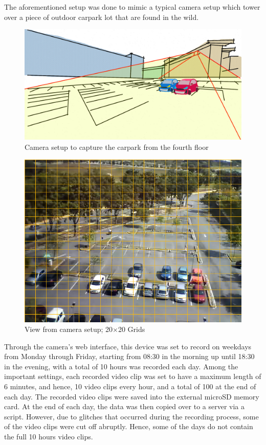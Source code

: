 The aforementioned setup was done to mimic a typical camera setup which tower over a piece of outdoor carpark lot that are found in the wild. 


\begin{figure}[hbt!]\centering
\includegraphics[width=.8\textwidth]{image/fcicarpark2.png}
\caption{Camera setup to capture the carpark from the fourth floor}
\label{fig:camerasetup}
\end{figure}


\begin{figure}[hbt!]\centering
\includegraphics[width=.7\textwidth]{image/general/grids.png}
\caption{View from camera setup; 20$\times$20 Grids}
\label{fig:viewfromcamera}
\end{figure}


Through the camera's web interface, this device was set to record on weekdays from Monday through Friday, starting from 08:30 in the morning up until 18:30 in the evening, with a total of 10 hours was recorded each day. Among the important settings, each recorded video clip was set to have a maximum length of 6 minutes, and hence, 10 video clips every hour, and a total of 100 at the end of each day. The recorded video clips were saved into the external microSD memory card. At the end of each day, the data was then copied over to a server via a script. However, due to glitches that occurred during the recording process, some of the video clips were cut off abruptly. Hence, some of the days do not contain the full 10 hours video clips. 

